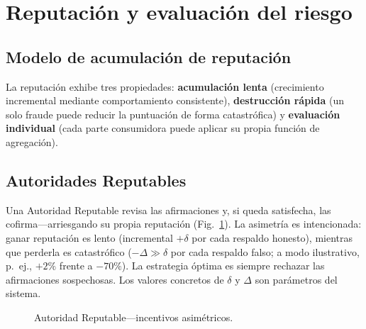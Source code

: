 \documentclass[11pt,a4paper,twocolumn]{article}
\begin{document}
\section{Reputación y evaluación del riesgo}

\subsection{Modelo de acumulación de reputación}

La reputación exhibe tres propiedades: \textbf{acumulación lenta} (crecimiento incremental mediante comportamiento consistente), \textbf{destrucción rápida} (un solo fraude puede reducir la puntuación de forma catastrófica) y \textbf{evaluación individual} (cada parte consumidora puede aplicar su propia función de agregación).

\subsection{Autoridades Reputables}

Una Autoridad Reputable revisa las afirmaciones y, si queda satisfecha, las cofirma---arriesgando su propia reputación (Fig.~\ref{fig:authority}). La asimetría es intencionada: ganar reputación es lento (incremental $+\delta$ por cada respaldo honesto), mientras que perderla es catastrófico ($-\Delta \gg \delta$ por cada respaldo falso; a modo ilustrativo, p.\ ej., $+2\%$ frente a $-70\%$). La estrategia óptima es siempre rechazar las afirmaciones sospechosas. Los valores concretos de $\delta$ y $\Delta$ son parámetros del sistema.

\begin{figure}[ht]
\centering
{}
\caption{Autoridad Reputable---incentivos asimétricos.}
\label{fig:authority}
\end{figure}
\end{document}
